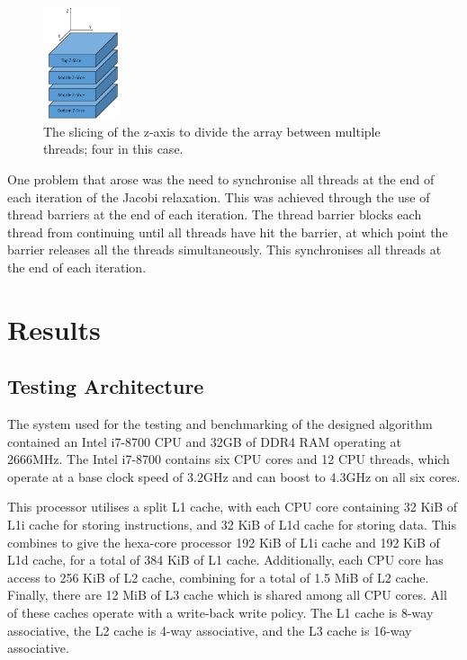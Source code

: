 \documentclass[12pt]{article}
\begin{document}
\begin{figure}[H]
    \begin{center}
        \includegraphics[width=0.2\textwidth]{fig/blocks.png}
        \caption{The slicing of the z-axis to divide the array between multiple threads; four in this case.}
        \label{fig:block-design}
    \end{center}
\end{figure}

One problem that arose was the need to synchronise all threads at the end of each iteration of the Jacobi relaxation.
This was achieved through the use of thread barriers at the end of each iteration. The thread barrier blocks each
thread from continuing until all threads have hit the barrier, at which point the barrier releases all the threads
simultaneously. This synchronises all threads at the end of each iteration.

\section{Results}

\subsection{Testing Architecture}
The system used for the testing and benchmarking of the designed algorithm contained an Intel i7-8700 CPU and
32GB of DDR4 RAM operating at 2666MHz. The Intel i7-8700 contains six CPU cores and 12 CPU threads, which operate
at a base clock speed of 3.2GHz and can boost to 4.3GHz on all six cores. 

This processor utilises a split L1 cache, with each CPU core containing 32 KiB of L1i cache for storing instructions,
and 32 KiB of L1d cache for storing data. This combines to give the hexa-core processor 192 KiB of L1i cache and
192 KiB of L1d cache, for a total of 384 KiB of L1 cache. Additionally, each CPU core has access to 256 KiB of L2
cache, combining for a total of 1.5 MiB of L2 cache. Finally, there are 12 MiB of L3 cache which is shared among
all CPU cores.  All of these caches operate with a write-back write policy. The L1 cache is 8-way associative, the
L2 cache is 4-way associative, and the L3 cache is 16-way associative.
\end{document}
